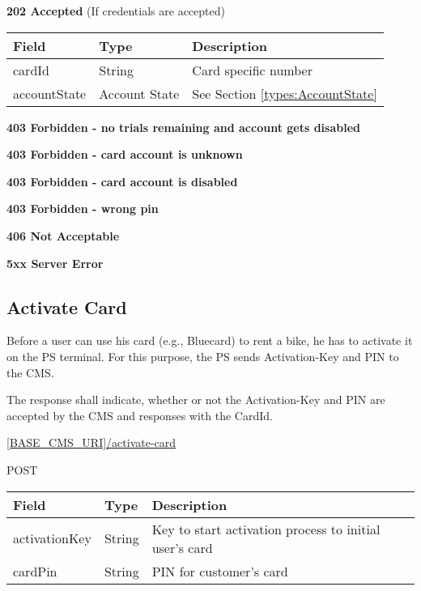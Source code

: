 \textbf{202 Accepted} (If credentials are accepted)

\begin{table}[!h]
\begin{tabularx}{\linewidth}{ | l | l | X | }
  \hline
  \rowcolor{table-head}
  Field & Type & Description \\
  \hline
  	cardId & String 		& Card specific number\\
  	accountState & Account State & See Section \ref{types:AccountState} \\
    \hline
\end{tabularx}
\end{table}
\textbf{403 Forbidden - no trials remaining and account gets disabled}

\textbf{403 Forbidden - card account is unknown}

\textbf{403 Forbidden - card account is disabled}

\textbf{403 Forbidden - wrong pin}

\textbf{406 Not Acceptable}

\textbf{5xx Server Error}

\subsection{Activate Card}

Before a user can use his card (e.g., Bluecard) to rent a bike, he has to activate it on the \acs{PS} terminal. For this purpose, the \acs{PS} sends Activation-Key and PIN to the \acs{CMS}.

The response shall indicate, whether or not the Activation-Key and PIN are accepted by the \acs{CMS} and responses with the CardId.

 \url{[BASE_CMS_URI]/activate-card}

 POST

\begin{table}[!h]
\vspace{-7mm}
\begin{tabularx}{\linewidth}{ | l | l | X | }
  \hline
  \rowcolor{table-head}
  Field & Type & Description \\
  \hline
  	activationKey & String & Key to start activation process to initial user's card\\
  	cardPin & String & PIN for customer's card\\
    \hline
\end{tabularx}
\end{table}

